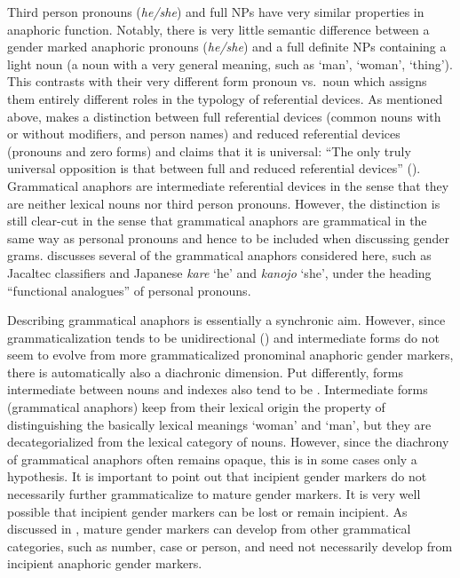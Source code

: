 \documentclass[output=collectionpaper]{langsci/langscibook}
\begin{document}
Third person pronouns (\textit{he/she}) and full NPs have very similar properties in anaphoric function. Notably, there is very little semantic difference between a gender marked anaphoric pronouns (\textit{he/she}) and a full definite NPs containing a light noun (a noun with a very general meaning, such as ‘man’, ‘woman’, ‘thing’). This contrasts with their very different form \textendash{} pronoun vs.\ noun \textendash{} which assigns them entirely different roles in the typology of referential devices. As mentioned above, \citet{Kibrik2011} makes a distinction between full referential devices (common nouns with or without modifiers, and person names) and reduced referential devices (pronouns and zero forms) and claims that it is universal: “The only truly universal opposition is that between full and reduced referential devices” (\citealt[42]{Kibrik2011}). Grammatical anaphors are intermediate referential devices in the sense that they are neither lexical nouns nor third person pronouns. However, the distinction is still clear-cut in the sense that grammatical anaphors are grammatical in the same way as personal pronouns and hence to be included when discussing gender grams. \citet[123--136]{Kibrik2011} discusses several of the grammatical anaphors considered here, such as Jacaltec classifiers and Japanese \textit{kare} ‘he’ and \textit{kanojo} ‘she’, under the heading “functional analogues” of personal pronouns.

Describing grammatical anaphors is essentially a synchronic aim. However, since grammaticalization tends to be unidirectional (\citealt{Haspelmath1999}) and intermediate forms do not seem to evolve from more grammaticalized pronominal anaphoric gender markers, there is automatically also a diachronic dimension. Put differently, forms intermediate between nouns and indexes also tend to be . Intermediate forms (grammatical anaphors) keep from their lexical origin the property of distinguishing the basically lexical meanings ‘woman’ and ‘man’, but they are decategorialized from the lexical category of nouns. However, since the diachrony of grammatical anaphors often remains opaque, this is in some cases only a hypothesis. It is important to point out that incipient gender markers do not necessarily further grammaticalize to mature gender markers. It is very well possible that incipient gender markers can be lost or remain incipient. As discussed in , mature gender markers can develop from other grammatical categories, such as number, case or person, and need not necessarily develop from incipient anaphoric gender markers.
\end{document}
